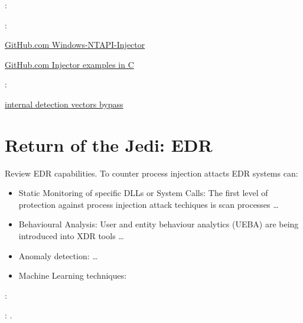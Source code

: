 \documentclass{article}
\begin{document}
\textbf{}: \textcite{Dequeker:2023}

\textbf{}: \textcite{S12h4ck:2023a}

\href{https://github.com/elddy/Windows-NTAPI-Injector}{GitHub.com Windows-NTAPI-Injector}

\href{https://gist.github.com/WKL-Sec/96e17188e4c159c2cdf7ff2c111130cc#file-local-c}{GitHub.com Injector examples in C}

\textbf{}: \textcite{S12h4ck:2023b}

\href{https://www.unknowncheats.me/forum/anti-cheat-bypass/286274-internal-detection-vectors-bypass.html}{internal detection vectors bypass}



\section{Return of the Jedi: EDR}

Review EDR capabilities.  To counter process injection attacts EDR systems can:

\begin{itemize}
\item Static Monitoring of specific DLLs or System Calls: The first level of protection against process injection attack techiques is
  scan processes \ldots
\item Behavioural Analysis: User and entity behaviour analytics (UEBA) are being introduced into XDR tools \ldots
\item Anomaly detection: \autocite{Pek:2016} \ldots
\item Machine Learning techniques: \autocite{Wang:2022}
\end{itemize}


\textbf{} \textcite{Jang:2007}:

\textbf{}: \textcite{Inam:2023}.
\end{document}
